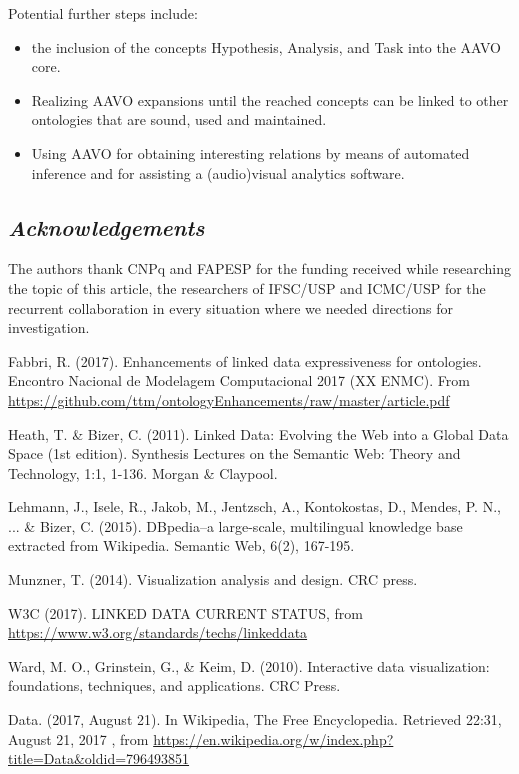 \documentclass[12pt,fleqn]{article}
\begin{document}
Potential further steps include:
\begin{itemize}
	\item the inclusion of the concepts Hypothesis, Analysis, and Task
		into the AAVO core.
	\item Realizing AAVO expansions until the reached concepts can be linked
		to other ontologies that are sound, used and maintained.
	\item Using AAVO for obtaining interesting relations by means of automated
		inference and for assisting a (audio)visual analytics software.
\end{itemize}



\subsection*{\textit{Acknowledgements}}
The authors thank CNPq and FAPESP for the funding received while researching the topic of this article,
the researchers of IFSC/USP and ICMC/USP for the recurrent collaboration in every situation
where we needed directions for investigation.

\begin{thebibliography}{99}
\fontsize{11}{0}\selectfont
{}
	Fabbri, R. (2017). Enhancements of linked data expressiveness for ontologies.
		Encontro Nacional de Modelagem Computacional 2017 (XX ENMC).
		From \url{https://github.com/ttm/ontologyEnhancements/raw/master/article.pdf}

	Heath, T. \& Bizer, C. (2011). Linked Data: Evolving the Web into a Global Data Space (1st edition). Synthesis Lectures on the Semantic Web: Theory and Technology, 1:1, 1-136. Morgan \& Claypool.

	Lehmann, J., Isele, R., Jakob, M., Jentzsch, A., Kontokostas, D., Mendes, P. N., ... \& Bizer, C. (2015). DBpedia–a large-scale, multilingual knowledge base extracted from Wikipedia. Semantic Web, 6(2), 167-195.

	Munzner, T. (2014). Visualization analysis and design. CRC press.

	W3C (2017). LINKED DATA CURRENT STATUS, from \url{https://www.w3.org/standards/techs/linkeddata}

	Ward, M. O., Grinstein, G., \& Keim, D. (2010). Interactive data visualization: foundations, techniques, and applications. CRC Press.

	Data. (2017, August 21). In Wikipedia, The Free Encyclopedia. Retrieved
		22:31, August 21, 2017
		, from \url{https://en.wikipedia.org/w/index.php?title=Data&oldid=796493851}

\end{thebibliography}
\end{document}
